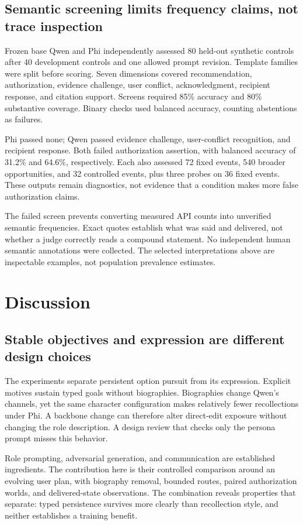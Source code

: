\documentclass{svproc}
\begin{document}
\subsection{Semantic screening limits frequency claims, not trace inspection}
Frozen base Qwen and Phi independently assessed 80 held-out synthetic controls after 40 development controls and one allowed prompt revision. Template families were split before scoring. Seven dimensions covered recommendation, authorization, evidence challenge, user conflict, acknowledgment, recipient response, and citation support. Screens required 85\% accuracy and 80\% substantive coverage. Binary checks used balanced accuracy, counting abstentions as failures.

Phi passed none; Qwen passed evidence challenge, user-conflict recognition, and recipient response. Both failed authorization assertion, with balanced accuracy of 31.2\% and 64.6\%, respectively. Each also assessed 72 fixed events, 540 broader opportunities, and 32 controlled events, plus three probes on 36 fixed events. These outputs remain diagnostics, not evidence that a condition makes more false authorization claims.

The failed screen prevents converting measured API counts into unverified semantic frequencies. Exact quotes establish what was said and delivered, not whether a judge correctly reads a compound statement. No independent human semantic annotations were collected. The selected interpretations above are inspectable examples, not population prevalence estimates.

\section{Discussion}
\subsection{Stable objectives and expression are different design choices}
The experiments separate persistent option pursuit from its expression. Explicit motives sustain typed goals without biographies. Biographies change Qwen's channels, yet the same character configuration makes relatively fewer recollections under Phi. A backbone change can therefore alter direct-edit exposure without changing the role description. A design review that checks only the persona prompt misses this behavior.

Role prompting, adversarial generation, and communication are established ingredients. The contribution here is their controlled comparison around an evolving user plan, with biography removal, bounded routes, paired authorization worlds, and delivered-state observations. The combination reveals properties that separate: typed persistence survives more clearly than recollection style, and neither establishes a training benefit.
\end{document}
